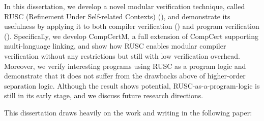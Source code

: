 In this dissertation, we develop a novel modular verification technique, called RUSC (Refinement
Under Self-related Contexts) (), and demonstrate its usefulness by applying it to
both compiler verification () and program verification ().
Specifically, we develop CompCertM, a full
extension of CompCert supporting multi-language
linking, and show how RUSC enables modular compiler verification without any restrictions but still with low verification overhead.
Moreover, we verify interesting programs using RUSC as a program logic and demonstrate that it does not suffer from the drawbacks above of higher-order separation logic.
Although the result shows potential, RUSC-as-a-program-logic is still in its early stage, and we discuss future research directions.


This dissertation draws heavily on the work and writing in the following paper: \cite{song:compcertm}

